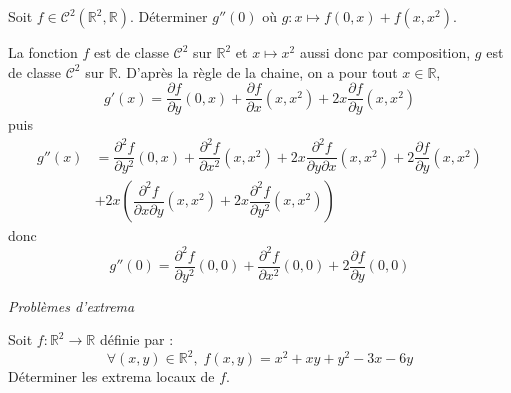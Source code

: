 \documentclass[a4paper,10pt]{report}
\begin{document}
\begin{Exa} Soit $f \in \mathcal{C}^2(\mathbb{R}^2, \mathbb{R})$. Déterminer $g''(0)$ où $g : x \mapsto f(0,x)+f(x,x^2)$.
\end{Exa}

\corr La fonction $f$ est de classe $\mathcal{C}^2$ sur $\mathbb{R}^2$ et $x \mapsto x^2$ aussi donc par composition, $g$ est de classe $\mathcal{C}^2$ sur $\mathbb{R}$. D'après la règle de la chaine, on a pour tout $x \in \mathbb{R}$,
$$ g'(x) = \dfrac{\partial f}{\partial y}(0,x) + \dfrac{\partial f}{\partial x}(x,x^2) + 2x \dfrac{\partial f}{\partial y}(x,x^2)$$
puis 
\begin{align*}
 g''(x) & = \dfrac{\partial^2 f}{\partial y^2}(0,x) +  \dfrac{\partial^2 f}{\partial x^2}(x,x^2) + 2x  \dfrac{\partial^2 f}{ \partial y\partial x}(x,x^2) + 2 \dfrac{\partial f}{\partial y}(x,x^2) \\
 & + 2x \left( \dfrac{\partial^2 f}{ \partial x \partial y}(x,x^2) + 2x\dfrac{\partial^2 f}{\partial y^2}(x,x^2) \right)
 \end{align*}
 donc
 $$ g''(0) =  \dfrac{\partial^2 f}{\partial y^2}(0,0) +  \dfrac{\partial^2 f}{\partial x^2}(0,0) + 2 \dfrac{\partial f}{\partial y}(0,0) $$
 
 
 \medskip
 
 \begin{center}
\textit{{ {\large Problèmes d'extrema}}}
\end{center}

\begin{Exa} Soit $f : \mathbb{R}^2 \rightarrow \mathbb{R}$ définie par :
$$ \forall (x,y) \in \mathbb{R}^2, \; f(x,y) = x^{2} + xy + y^{2} - 3x - 6y$$
Déterminer les extrema locaux de $f$.
\end{Exa}
\end{document}
